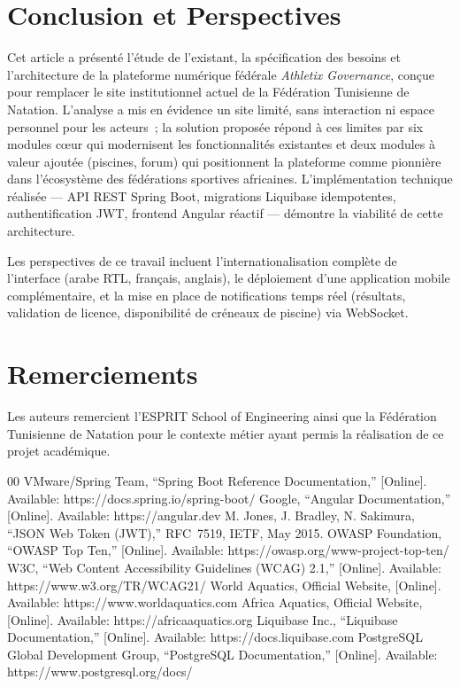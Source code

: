 \documentclass[conference]{IEEEtran}
\begin{document}
\section{Conclusion et Perspectives}
Cet article a présenté l'étude de l'existant, la spécification des besoins et l'architecture de la plateforme numérique fédérale \emph{Athletix Governance}, conçue pour remplacer le site institutionnel actuel de la Fédération Tunisienne de Natation. L'analyse a mis en évidence un site limité, sans interaction ni espace personnel pour les acteurs~; la solution proposée répond à ces limites par six modules cœur qui modernisent les fonctionnalités existantes et deux modules à valeur ajoutée (piscines, forum) qui positionnent la plateforme comme pionnière dans l'écosystème des fédérations sportives africaines. L'implémentation technique réalisée — API REST Spring Boot, migrations Liquibase idempotentes, authentification JWT, frontend Angular réactif — démontre la viabilité de cette architecture.

Les perspectives de ce travail incluent l'internationalisation complète de l'interface (arabe RTL, français, anglais), le déploiement d'une application mobile complémentaire, et la mise en place de notifications temps réel (résultats, validation de licence, disponibilité de créneaux de piscine) via WebSocket.

\section*{Remerciements}
Les auteurs remercient l'ESPRIT School of Engineering ainsi que la Fédération Tunisienne de Natation pour le contexte métier ayant permis la réalisation de ce projet académique.

\begin{thebibliography}{00}
 VMware/Spring Team, ``Spring Boot Reference Documentation,'' [Online]. Available: https://docs.spring.io/spring-boot/
 Google, ``Angular Documentation,'' [Online]. Available: https://angular.dev
 M. Jones, J. Bradley, N. Sakimura, ``JSON Web Token (JWT),'' RFC~7519, IETF, May 2015.
 OWASP Foundation, ``OWASP Top Ten,'' [Online]. Available: https://owasp.org/www-project-top-ten/
 W3C, ``Web Content Accessibility Guidelines (WCAG) 2.1,'' [Online]. Available: https://www.w3.org/TR/WCAG21/
 World Aquatics, Official Website, [Online]. Available: https://www.worldaquatics.com
 Africa Aquatics, Official Website, [Online]. Available: https://africaaquatics.org
 Liquibase Inc., ``Liquibase Documentation,'' [Online]. Available: https://docs.liquibase.com
 PostgreSQL Global Development Group, ``PostgreSQL Documentation,'' [Online]. Available: https://www.postgresql.org/docs/
\end{thebibliography}
\end{document}
